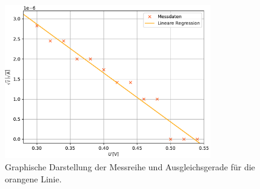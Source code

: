 \begin{figure}[H]
    \centering
    \includegraphics[width=0.8\textwidth]{Plots/orange.pdf}
    \caption{Graphische Darstellung der Messreihe und Ausgleichsgerade für die orangene Linie.}
    \label{fig:orange}
\end{figure}

